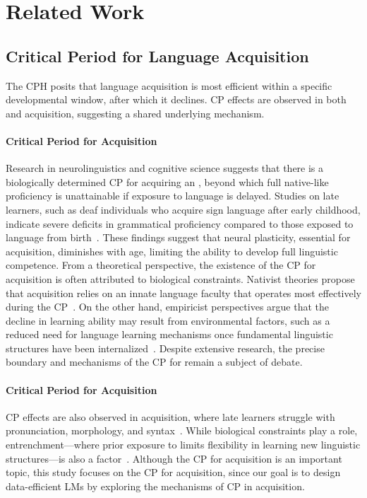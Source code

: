 \section{Related Work}
\subsection{Critical Period for Language Acquisition}
\label{subsec:cp}

The CPH posits that language acquisition is most efficient within a specific developmental window, after which it declines. 
CP effects are observed in both \lone and \ltwo acquisition, suggesting a shared underlying mechanism. 


\paragraph{Critical Period for \lone Acquisition}
Research in neurolinguistics and cognitive science suggests that there is a biologically determined CP for acquiring an \lone, beyond which full native-like proficiency is unattainable if exposure to language is delayed. 
Studies on late \lone learners, such as deaf individuals who acquire sign language after early childhood, indicate severe deficits in grammatical proficiency compared to those exposed to language from birth~\cite{mayberry1989looking, NEWPORT199011}. 
These findings suggest that neural plasticity, essential for \lone acquisition, diminishes with age, limiting the ability to develop full linguistic competence.
From a theoretical perspective, the existence of the CP for \lone acquisition is often attributed to biological constraints. 
Nativist theories propose that \lone acquisition relies on an innate language faculty that operates most effectively during the CP~\cite{penfield1965conditioning,chomsky1965,pinker1994language}. 
On the other hand, empiricist perspectives argue that the decline in \lone learning ability may result from environmental factors, such as a reduced need for language learning mechanisms once fundamental linguistic structures have been internalized~\cite{elman1996rethinking,seidenberg2006connectionist}. 
Despite extensive research, the precise boundary and mechanisms of the CP for \lone remain a subject of debate.




\paragraph{Critical Period for \ltwo Acquisition}
CP effects are also observed in \ltwo acquisition, where late learners struggle with pronunciation, morphology, and syntax~\cite{JOHNSON198960,hartshorne2018critical}. 
While biological constraints play a role, entrenchment—where prior exposure to \lone limits flexibility in learning new linguistic structures—is also a factor~\cite{ellis2000age, seidenberg2006connectionist}. 
Although the CP for \ltwo acquisition is an important topic, this study focuses on the CP for \lone acquisition, since our goal is to design data-efficient LMs by exploring the mechanisms of CP in \lone acquisition.






